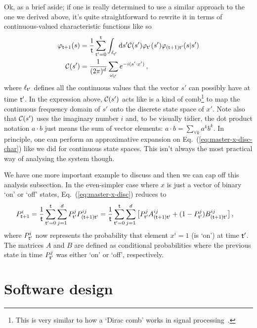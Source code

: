 \documentclass{book}
\begin{document}
Ok, as a brief aside; if one is really determined to use a similar approach to the one we derived above, it's quite straightforward to rewrite it in terms of continuous-valued characteristic functions like so
\begin{align}
\varphi_{{\sf t}+1}(s) &= \frac{1}{{\sf t}}\sum_{{\sf t}'=0}^{\sf t}\int_{\ell_{{\sf t}'}}{\rm d}s' {\cal C}(s') \varphi_{{\sf t}'}(s') \varphi_{({\sf t}+1){\sf t}'}(s \vert s') \label{eq:master-x-disc-char} \\
{\cal C}(s') &= \frac{1}{(2\pi )^d}\sum_{\omega_{{\sf t}'}}e^{-i(s'\cdot x')} \,,
\end{align}
where $\ell_{{\sf t}'}$ defines all the continuous values that the vector $s'$ can possibly have at time ${\sf t}'$. In the expression above, ${\cal C}(s')$ acts like is a kind of comb\footnote{This is very similar to how a `Dirac comb' works in signal processing~\cite{brandwood2012fourier}.} to map the continuous frequency domain of $s'$ onto the discrete state space of $x'$. Note also that ${\cal C}(s')$ uses the imaginary number $i$ and, to be visually tidier, the dot product notation $a\cdot b$ just means the sum of vector elements: $a\cdot b = \sum_{\forall k}a^kb^k$. In principle, one can perform an approximative expansion on Eq.~(\ref{eq:master-x-disc-char}) like we did for continuous state spaces. This isn't always the most practical way of analysing the system though. 

We have one more important example to discuss and then we can cap off this analysis subsection. In the even-simpler case where $x$ is just a vector of binary `on' or `off' states, Eq.~(\ref{eq:master-x-disc}) reduces to
\begin{align}
P^i_{{\sf t}+1} &= \frac{1}{{\sf t}}\sum_{{\sf t}'=0}^{\sf t} \sum_{j=1}^d P^j_{{\sf t}'} P^{ij}_{({\sf t}+1){\sf t}'} = \frac{1}{{\sf t}}\sum_{{\sf t}'=0}^{\sf t} \sum_{j=1}^d \big[ P^j_{{\sf t}'} A^{ij}_{({\sf t}+1){\sf t}'} + (1-P^j_{{\sf t}'}) B^{ij}_{({\sf t}+1){\sf t}'} \big] \label{eq:master-x-disc-binary}\,,
\end{align}
where $P^i_{{\sf t}'}$ now represents the probability that element $x^i=1$ (is `on') at time ${\sf t}'$. The matrices $A$ and $B$ are defined as conditional probabilities where the previous state in time $P^j_{{\sf t}'}$ was either `on' or `off', respectively.

\section{\sffamily Software design}
\end{document}
